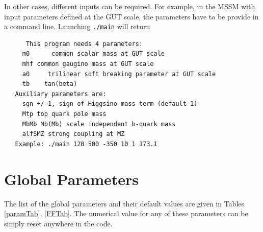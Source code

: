 \documentclass[12pt,a4paper]{article}
\begin{document}
In other cases, different inputs can be required. For example, in the MSSM with input parameters defined at the GUT scale,
the parameters have to be provide in a command line. Launching \verb|./main| will return 
\begin{verbatim}
      This program needs 4 parameters:
     m0      common scalar mass at GUT scale
     mhf common gaugino mass at GUT scale
     a0     trilinear soft breaking parameter at GUT scale
     tb    tan(beta)
   Auxiliary parameters are:
     sgn +/-1, sign of Higgsino mass term (default 1)
     Mtp top quark pole mass
     MbMb Mb(Mb) scale independent b-quark mass
     alfSMZ strong coupling at MZ
   Example: ./main 120 500 -350 10 1 173.1
\end{verbatim}



\section{ Global Parameters}

 The list of the
global parameters  and their default values  are given  in Tables
\ref{paramTab}, \ref{FFTab}. 
The numerical value for any of these parameters can be simply reset anywhere in the code. 
\end{document}
